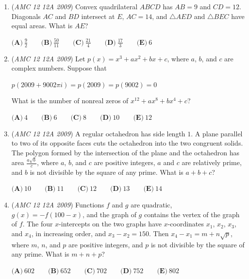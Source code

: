 \begin{enumerate}
 $\textbf{(A)}\ A = \frac {25}{49}B\qquad \textbf{(B)}\ A = \frac {5}{7}B\qquad \textbf{(C)}\ A = B\qquad \textbf{(D)}\ A$ $= \frac {7}{5}B\qquad \textbf{(E)}\ A = \frac {49}{25}B$


	\item (\textit{AMC 12 12A 2009}) Convex quadrilateral $ABCD$ has $AB = 9$ and $CD = 12$.  Diagonals $AC$ and $BD$ intersect at $E$, $AC = 14$, and $\triangle AED$ and $\triangle BEC$ have equal areas.  What is $AE$?


 $\textbf{(A)}\ \frac {9}{2}\qquad \textbf{(B)}\ \frac {50}{11}\qquad \textbf{(C)}\ \frac {21}{4}\qquad \textbf{(D)}\ \frac {17}{3}\qquad \textbf{(E)}\ 6$


	\item (\textit{AMC 12 12A 2009}) Let $p(x) = x^3 + ax^2 + bx + c$, where $a$, $b$, and $c$ are complex numbers.  Suppose that


 $p(2009 + 9002\pi i) = p(2009) = p(9002) = 0$

 What is the number of nonreal zeros of $x^{12} + ax^8 + bx^4 + c$?


 $\textbf{(A)}\ 4\qquad \textbf{(B)}\ 6\qquad \textbf{(C)}\ 8\qquad \textbf{(D)}\ 10\qquad \textbf{(E)}\ 12$


	\item (\textit{AMC 12 12A 2009}) A regular octahedron has side length $1$. A plane parallel to two of its opposite faces cuts the octahedron into the two congruent solids. The polygon formed by the intersection of the plane and the octahedron has area $\frac {a\sqrt {b}}{c}$, where $a$, $b$, and $c$ are positive integers, $a$ and $c$ are relatively prime, and $b$ is not divisible by the square of any prime. What is $a + b + c$?


 $\textbf{(A)}\ 10\qquad \textbf{(B)}\ 11\qquad \textbf{(C)}\ 12\qquad \textbf{(D)}\ 13\qquad \textbf{(E)}\ 14$


	\item (\textit{AMC 12 12A 2009}) Functions $f$ and $g$ are quadratic, $g(x) = - f(100 - x)$, and the graph of $g$ contains the vertex of the graph of $f$. The four $x$-intercepts on the two graphs have $x$-coordinates $x_1$, $x_2$, $x_3$, and $x_4$, in increasing order, and $x_3 - x_2 = 150$. Then $x_4 - x_1 = m + n\sqrt p$, where $m$, $n$, and $p$ are positive integers, and $p$ is not divisible by the square of any prime. What is $m + n + p$?


 $\textbf{(A)}\ 602\qquad \textbf{(B)}\ 652\qquad \textbf{(C)}\ 702\qquad \textbf{(D)}\ 752 \qquad \textbf{(E)}\ 802$



\end{enumerate}
